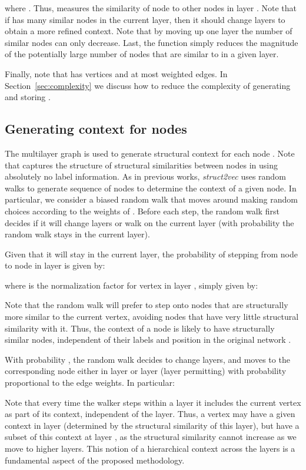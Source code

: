 \documentclass[sigconf]{acmart}
\begin{document}
where . Thus,  measures the similarity of node  to other nodes in layer . Note that if  has many similar nodes in the current layer, then it should change layers to obtain a more refined context. Note that by moving up one layer the number of similar nodes can only decrease. Last, the  function simply reduces the magnitude of the potentially large number of nodes that are similar to  in a given layer. 

Finally, note that  has  vertices and at most  weighted edges. In Section~\ref{sec:complexity} we discuss how to reduce the complexity of generating and storing . 

\subsection{Generating context for nodes} \label{seqs}

The multilayer graph  is used to generate structural context for each node . Note that  captures the structure of structural similarities between nodes in  using absolutely no label information. As in previous works, \textit{struct2vec} uses random walks to generate sequence of nodes to determine the context of a given node. In particular, we consider a biased random walk that moves around  making random choices according to the weights of . Before each step, the random walk first decides if it will change layers or walk on the current layer (with probability  the random walk stays in the current layer). 

Given that it will stay in the current layer, the probability of stepping from node  to node  in layer  is given by: 

where  is the normalization factor for vertex  in layer , simply given by:

Note that the random walk will prefer to step onto nodes that are structurally more similar to the current vertex, avoiding nodes that have very little structural similarity with it. Thus, the context of a node  is likely to have structurally similar nodes, independent of their labels and position in the original network . 

With probability , the random walk decides to change layers, and moves to the corresponding node either in layer  or layer  (layer permitting) with probability proportional to the edge weights. In particular:

Note that every time the walker steps within a layer it includes the current vertex as part of its context, independent of the layer. Thus, a vertex  may have a given context in layer  (determined by the structural similarity of this layer), but have a subset of this context at layer , as the structural similarity cannot increase as we move to higher layers. This notion of a hierarchical context across the layers is a fundamental aspect of the proposed methodology. 
\end{document}
